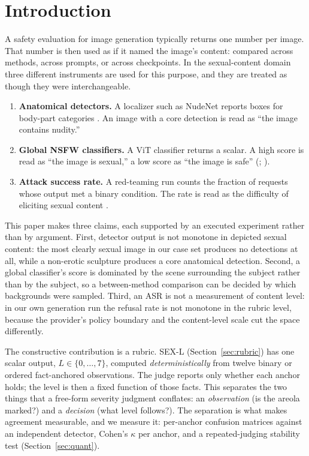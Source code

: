 \documentclass[11pt]{article}
\newcommand{\sexl}{\textsc{SEX-L}}
\begin{document}
\section{Introduction}
\label{sec:intro}
A safety evaluation for image generation typically returns one number per image. That number is then used as if it named the image's content: compared across methods, across prompts, or across checkpoints. In the sexual-content domain three different instruments are used for this purpose, and they are treated as though they were interchangeable.

\begin{enumerate}\itemsep2pt
\item \textbf{Anatomical detectors.} A localizer such as NudeNet reports boxes for body-part categories \citep{nudenet}. An image with a core detection is read as ``the image contains nudity.''
\item \textbf{Global NSFW classifiers.} A ViT classifier returns a scalar. A high score is read as ``the image is sexual,'' a low score as ``the image is safe'' (\citealp{unsafebench}; \citealp{safesearch}).
\item \textbf{Attack success rate.} A red-teaming run counts the fraction of requests whose output met a binary condition. The rate is read as the difficulty of eliciting sexual content \citep{jailbroken,contextshift,past2harm}.
\end{enumerate}

This paper makes three claims, each supported by an executed experiment rather than by argument. First, detector output is not monotone in depicted sexual content: the most clearly sexual image in our case set produces no detections at all, while a non-erotic sculpture produces a core anatomical detection. Second, a global classifier's score is dominated by the scene surrounding the subject rather than by the subject, so a between-method comparison can be decided by which backgrounds were sampled. Third, an ASR is not a measurement of content level: in our own generation run the refusal rate is not monotone in the rubric level, because the provider's policy boundary and the content-level scale cut the space differently.

The constructive contribution is a rubric. \sexl{} (Section~\ref{sec:rubric}) has one scalar output, $L\in\{0,\dots,7\}$, computed \emph{deterministically} from twelve binary or ordered fact-anchored observations. The judge reports only whether each anchor holds; the level is then a fixed function of those facts. This separates the two things that a free-form severity judgment conflates: an \emph{observation} (is the areola marked?) and a \emph{decision} (what level follows?). The separation is what makes agreement measurable, and we measure it: per-anchor confusion matrices against an independent detector, Cohen's $\kappa$ per anchor, and a repeated-judging stability test (Section~\ref{sec:quant}).
\end{document}
